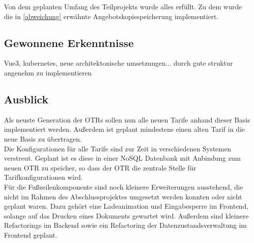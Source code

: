  Von dem geplanten Umfang des Teilprojekts wurde alles erfüllt. Zu dem wurde die in \ref{abweichung} erwähnte Angebotskopiespeicherung implementiert.
\subsection{Gewonnene Erkenntnisse}
\label{erkenntnisse}
Vue3, kubernetes, neue architektonische umsetzungen...
durch gute struktur angenehm zu implementieren
\subsection{Ausblick}
\label{ausblick}
Als neuste Generation der \ac{OTR}s sollen nun alle neuen Tarife anhand dieser Basis implementiert werden. Außerdem ist geplant mindestens einen alten Tarif in die neue Basis zu übertragen.\\
Die Konfigurationen für alle Tarife sind zur Zeit in verschiedenen Systemen verstreut. Geplant ist es diese in einer NoSQL Datenbank mit Anbindung zum neuen \ac{OTR} zu speicher, so dass der \ac{OTR} die zentrale Stelle für Tarifkonfigurationen wird.\\
Für die Fußzeilenkomponente sind noch kleinere Erweiterungen ausstehend, die nicht im Rahmen des Abschlussprojektes umgesetzt werden konnten oder nicht geplant waren. Dazu gehört eine Ladeanimation und Eingabesperre im Frontend, solange auf das Drucken eines Dokuments gewartet wird. Außerdem sind kleinere Refactorings im Backend sowie ein Refactoring der Datenzustandsverwaltung im Frontend geplant.
